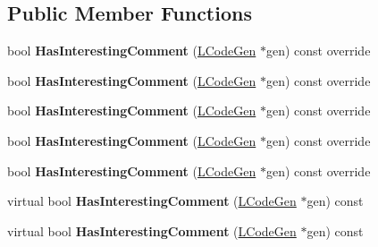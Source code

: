 \subsection*{Public Member Functions}
\begin{DoxyCompactItemize}
\item 
bool {\bfseries Has\+Interesting\+Comment} (\hyperlink{classv8_1_1internal_1_1_l_code_gen}{L\+Code\+Gen} $\ast$gen) const  override\hypertarget{classv8_1_1internal_1_1_l_parameter_a8de03f60e00c9474dcde294fcd58f6ba}{}\label{classv8_1_1internal_1_1_l_parameter_a8de03f60e00c9474dcde294fcd58f6ba}

\item 
bool {\bfseries Has\+Interesting\+Comment} (\hyperlink{classv8_1_1internal_1_1_l_code_gen}{L\+Code\+Gen} $\ast$gen) const  override\hypertarget{classv8_1_1internal_1_1_l_parameter_a8de03f60e00c9474dcde294fcd58f6ba}{}\label{classv8_1_1internal_1_1_l_parameter_a8de03f60e00c9474dcde294fcd58f6ba}

\item 
bool {\bfseries Has\+Interesting\+Comment} (\hyperlink{classv8_1_1internal_1_1_l_code_gen}{L\+Code\+Gen} $\ast$gen) const  override\hypertarget{classv8_1_1internal_1_1_l_parameter_a8de03f60e00c9474dcde294fcd58f6ba}{}\label{classv8_1_1internal_1_1_l_parameter_a8de03f60e00c9474dcde294fcd58f6ba}

\item 
bool {\bfseries Has\+Interesting\+Comment} (\hyperlink{classv8_1_1internal_1_1_l_code_gen}{L\+Code\+Gen} $\ast$gen) const  override\hypertarget{classv8_1_1internal_1_1_l_parameter_a8de03f60e00c9474dcde294fcd58f6ba}{}\label{classv8_1_1internal_1_1_l_parameter_a8de03f60e00c9474dcde294fcd58f6ba}

\item 
bool {\bfseries Has\+Interesting\+Comment} (\hyperlink{classv8_1_1internal_1_1_l_code_gen}{L\+Code\+Gen} $\ast$gen) const  override\hypertarget{classv8_1_1internal_1_1_l_parameter_a8de03f60e00c9474dcde294fcd58f6ba}{}\label{classv8_1_1internal_1_1_l_parameter_a8de03f60e00c9474dcde294fcd58f6ba}

\item 
virtual bool {\bfseries Has\+Interesting\+Comment} (\hyperlink{classv8_1_1internal_1_1_l_code_gen}{L\+Code\+Gen} $\ast$gen) const \hypertarget{classv8_1_1internal_1_1_l_parameter_a94a9d6ff2c0668bbb1afea9ee32c9098}{}\label{classv8_1_1internal_1_1_l_parameter_a94a9d6ff2c0668bbb1afea9ee32c9098}

\item 
virtual bool {\bfseries Has\+Interesting\+Comment} (\hyperlink{classv8_1_1internal_1_1_l_code_gen}{L\+Code\+Gen} $\ast$gen) const \hypertarget{classv8_1_1internal_1_1_l_parameter_a94a9d6ff2c0668bbb1afea9ee32c9098}{}\label{classv8_1_1internal_1_1_l_parameter_a94a9d6ff2c0668bbb1afea9ee32c9098}


\end{DoxyCompactItemize}
